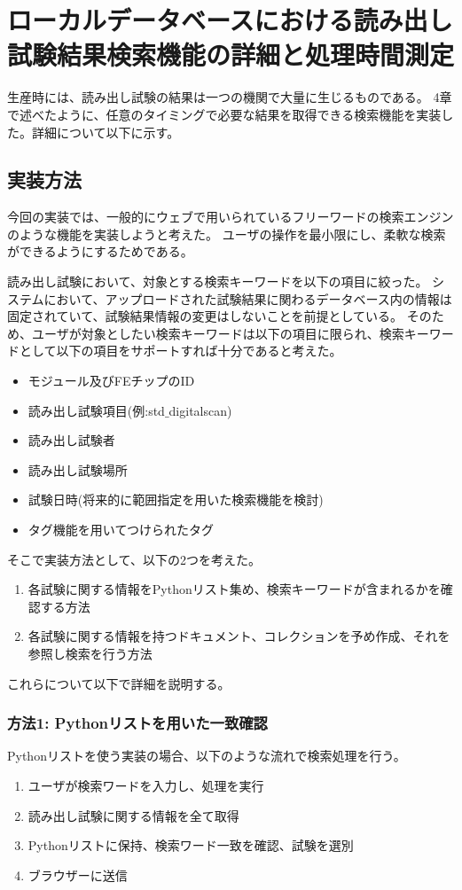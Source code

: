 \chapter{ローカルデータベースにおける読み出し試験結果検索機能の詳細と処理時間測定}

生産時には、読み出し試験の結果は一つの機関で大量に生じるものである。
4章で述べたように、任意のタイミングで必要な結果を取得できる検索機能を実装した。詳細について以下に示す。


\section{実装方法}
今回の実装では、一般的にウェブで用いられているフリーワードの検索エンジンのような機能を実装しようと考えた。
ユーザの操作を最小限にし、柔軟な検索ができるようにするためである。

読み出し試験において、対象とする検索キーワードを以下の項目に絞った。
システムにおいて、アップロードされた試験結果に関わるデータベース内の情報は固定されていて、試験結果情報の変更はしないことを前提としている。
そのため、ユーザが対象としたい検索キーワードは以下の項目に限られ、検索キーワードとして以下の項目をサポートすれば十分であると考えた。

\begin{itemize}
  \item モジュール及びFEチップのID
  \item 読み出し試験項目(例:std$\_$digitalscan)
  \item 読み出し試験者
  \item 読み出し試験場所
  \item 試験日時(将来的に範囲指定を用いた検索機能を検討)
  \item タグ機能を用いてつけられたタグ
\end{itemize}

そこで実装方法として、以下の2つを考えた。

\begin{enumerate}
  \item 各試験に関する情報をPythonリスト集め、検索キーワードが含まれるかを確認する方法
  \item 各試験に関する情報を持つドキュメント、コレクションを予め作成、それを参照し検索を行う方法
\end{enumerate}

これらについて以下で詳細を説明する。

\subsection{方法1: Pythonリストを用いた一致確認}
Pythonリストを使う実装の場合、以下のような流れで検索処理を行う。
\begin{enumerate}
  \item ユーザが検索ワードを入力し、処理を実行
  \item 読み出し試験に関する情報を全て取得
  \item Pythonリストに保持、検索ワード一致を確認、試験を選別
  \item ブラウザーに送信
\end{enumerate}


